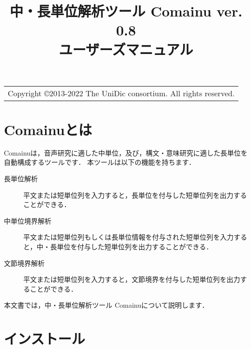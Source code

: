 \documentclass[titlepage]{jarticle}
\title{中・長単位解析ツール Comainu ver. 0.8\\ ユーザーズマニュアル}
\author{
}
\date{}
\begin{document}
\begin{table}[!b]
\flushright
\small
\begin{tabular}{r}
Copyright \copyright 2013-2022 The UniDic consortium. All rights reserved.
\end{tabular}
\end{table}
\maketitle

\tableofcontents
\thispagestyle{empty}
\clearpage

\setcounter{page}{1}
\pagestyle{plain}


\section{Comainuとは}
Comainuは，音声研究に適した中単位，及び，構文・意味研究に適した長単位を自動構成するツールです．
本ツールは以下の機能を持ちます．
\begin{description}
\item[長単位解析]
平文または短単位列を入力すると，長単位を付与した短単位列を出力することができる．
\item[中単位境界解析]
平文または短単位列もしくは長単位情報を付与された短単位列を入力すると，中・長単位を付与した短単位列を出力することができる．
\item[文節境界解析]
平文または短単位列を入力すると，文節境界を付与した短単位列を出力することができる．
\end{description}
本文書では，中・長単位解析ツール Comainuについて説明します．

\section{インストール}
\end{document}
